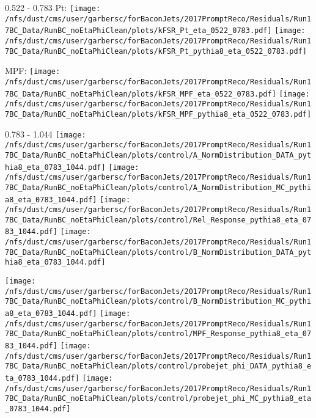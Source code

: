 \documentclass[t,compress]{beamer}
\begin{document}
\begin{frame}{0.522 - 0.783}
	 Pt: \texttt{[image: /nfs/dust/cms/user/garbersc/forBaconJets/2017PromptReco/Residuals/Run17BC\_Data/RunBC\_noEtaPhiClean/plots/kFSR\_Pt\_eta\_0522\_0783.pdf]}
	\texttt{[image: /nfs/dust/cms/user/garbersc/forBaconJets/2017PromptReco/Residuals/Run17BC\_Data/RunBC\_noEtaPhiClean/plots/kFSR\_Pt\_pythia8\_eta\_0522\_0783.pdf]}
\newline

	 MPF: \texttt{[image: /nfs/dust/cms/user/garbersc/forBaconJets/2017PromptReco/Residuals/Run17BC\_Data/RunBC\_noEtaPhiClean/plots/kFSR\_MPF\_eta\_0522\_0783.pdf]}
	\texttt{[image: /nfs/dust/cms/user/garbersc/forBaconJets/2017PromptReco/Residuals/Run17BC\_Data/RunBC\_noEtaPhiClean/plots/kFSR\_MPF\_pythia8\_eta\_0522\_0783.pdf]}
\end{frame}

\begin{frame}{0.783 - 1.044}
	\texttt{[image: /nfs/dust/cms/user/garbersc/forBaconJets/2017PromptReco/Residuals/Run17BC\_Data/RunBC\_noEtaPhiClean/plots/control/A\_NormDistribution\_DATA\_pythia8\_eta\_0783\_1044.pdf]}
	\texttt{[image: /nfs/dust/cms/user/garbersc/forBaconJets/2017PromptReco/Residuals/Run17BC\_Data/RunBC\_noEtaPhiClean/plots/control/A\_NormDistribution\_MC\_pythia8\_eta\_0783\_1044.pdf]}
	\texttt{[image: /nfs/dust/cms/user/garbersc/forBaconJets/2017PromptReco/Residuals/Run17BC\_Data/RunBC\_noEtaPhiClean/plots/control/Rel\_Response\_pythia8\_eta\_0783\_1044.pdf]}
	\texttt{[image: /nfs/dust/cms/user/garbersc/forBaconJets/2017PromptReco/Residuals/Run17BC\_Data/RunBC\_noEtaPhiClean/plots/control/B\_NormDistribution\_DATA\_pythia8\_eta\_0783\_1044.pdf]}
\newline

	\texttt{[image: /nfs/dust/cms/user/garbersc/forBaconJets/2017PromptReco/Residuals/Run17BC\_Data/RunBC\_noEtaPhiClean/plots/control/B\_NormDistribution\_MC\_pythia8\_eta\_0783\_1044.pdf]}
	\texttt{[image: /nfs/dust/cms/user/garbersc/forBaconJets/2017PromptReco/Residuals/Run17BC\_Data/RunBC\_noEtaPhiClean/plots/control/MPF\_Response\_pythia8\_eta\_0783\_1044.pdf]}
	\texttt{[image: /nfs/dust/cms/user/garbersc/forBaconJets/2017PromptReco/Residuals/Run17BC\_Data/RunBC\_noEtaPhiClean/plots/control/probejet\_phi\_DATA\_pythia8\_eta\_0783\_1044.pdf]}
	\texttt{[image: /nfs/dust/cms/user/garbersc/forBaconJets/2017PromptReco/Residuals/Run17BC\_Data/RunBC\_noEtaPhiClean/plots/control/probejet\_phi\_MC\_pythia8\_eta\_0783\_1044.pdf]}
\end{frame}
\end{document}
